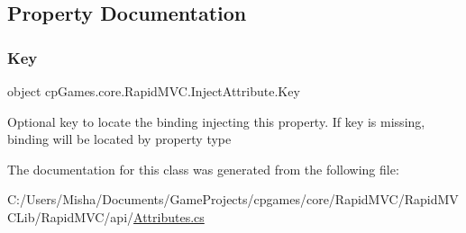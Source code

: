 \subsection{Property Documentation}
\mbox{\label{classcp_games_1_1core_1_1_rapid_m_v_c_1_1_inject_attribute_a31cad4210e35805fc8443756c8e268e1}} 
\subsubsection{\texorpdfstring{Key}{Key}}
{\footnotesize\ttfamily object cp\+Games.\+core.\+Rapid\+M\+V\+C.\+Inject\+Attribute.\+Key\hspace{0.3cm}{\ttfamily [get]}}



Optional key to locate the binding injecting this property. If key is missing, binding will be located by property type 



The documentation for this class was generated from the following file\+:\begin{DoxyCompactItemize}
\item 
C\+:/\+Users/\+Misha/\+Documents/\+Game\+Projects/cpgames/core/\+Rapid\+M\+V\+C/\+Rapid\+M\+V\+C\+Lib/\+Rapid\+M\+V\+C/api/\mbox{\hyperlink{_attributes_8cs}{Attributes.\+cs}}\end{DoxyCompactItemize}
